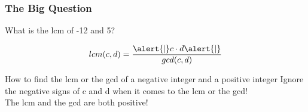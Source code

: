 \documentclass[
	11pt, %
]{beamer}
\begin{document}
\begin{frame}
	\frametitle{The Big Question}
	\bigskip
	{\LARGE What is the lcm of -12 and 5?  }
	\bigskip
	\pause

	\begin{equation*}
		lcm(c, d) = \frac{\alert{\mid} c \cdot d \alert{\mid}}{gcd(c, d)}
	\end{equation*}

	\begin{alertblock}{How to find the lcm or the gcd of a negative integer and a positive integer}
	    Ignore the negative signs of c and d when it comes to the lcm or the gcd! \\ The lcm and the gcd are both positive!
	\end{alertblock}

\end{frame}
\end{document}
